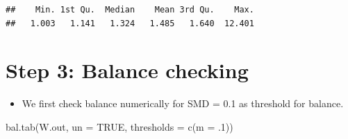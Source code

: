 \documentclass[
]{book}
\newenvironment{Shaded}{\begin{snugshade}}{\end{snugshade}}
\newcommand{\AttributeTok}[1]{\textcolor[rgb]{0.77,0.63,0.00}{#1}}
\newcommand{\ConstantTok}[1]{\textcolor[rgb]{0.00,0.00,0.00}{#1}}
\newcommand{\DecValTok}[1]{\textcolor[rgb]{0.00,0.00,0.81}{#1}}
\newcommand{\FunctionTok}[1]{\textcolor[rgb]{0.00,0.00,0.00}{#1}}
\newcommand{\NormalTok}[1]{#1}
\providecommand{\tightlist}{%
  \setlength{\itemsep}{0pt}\setlength{\parskip}{0pt}}
\begin{document}
\begin{verbatim}
##    Min. 1st Qu.  Median    Mean 3rd Qu.    Max. 
##   1.003   1.141   1.324   1.485   1.640  12.401
\end{verbatim}

\hypertarget{step-3-balance-checking-1}{%
\section{Step 3: Balance checking}\label{step-3-balance-checking-1}}

\begin{itemize}
\tightlist
\item
  We first check balance numerically for SMD = 0.1 as threshold for balance.
\end{itemize}

\begin{Shaded}
\begin{Highlighting}[]
\FunctionTok{bal.tab}\NormalTok{(W.out, }\AttributeTok{un =} \ConstantTok{TRUE}\NormalTok{, }
        \AttributeTok{thresholds =} \FunctionTok{c}\NormalTok{(}\AttributeTok{m =}\NormalTok{ .}\DecValTok{1}\NormalTok{))}
\end{Highlighting}
\end{Shaded}
\end{document}

